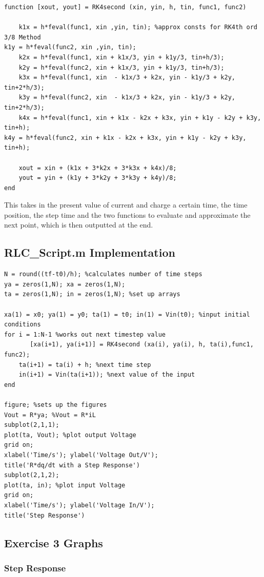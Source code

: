 \documentclass[11pt,a4paper]{article}
\begin{document}
\begin{verbatim}
function [xout, yout] = RK4second (xin, yin, h, tin, func1, func2)

	k1x = h*feval(func1, xin ,yin, tin); %approx consts for RK4th ord 3/8 Method
k1y = h*feval(func2, xin ,yin, tin);
	k2x = h*feval(func1, xin + k1x/3, yin + k1y/3, tin+h/3);
	k2y = h*feval(func2, xin + k1x/3, yin + k1y/3, tin+h/3);
	k3x = h*feval(func1, xin  - k1x/3 + k2x, yin - k1y/3 + k2y, tin+2*h/3);
	k3y = h*feval(func2, xin  - k1x/3 + k2x, yin - k1y/3 + k2y, tin+2*h/3);
	k4x = h*feval(func1, xin + k1x - k2x + k3x, yin + k1y - k2y + k3y, tin+h);
k4y = h*feval(func2, xin + k1x - k2x + k3x, yin + k1y - k2y + k3y, tin+h);

	xout = xin + (k1x + 3*k2x + 3*k3x + k4x)/8;
	yout = yin + (k1y + 3*k2y + 3*k3y + k4y)/8;
end
\end{verbatim}

This takes in the present value of current and charge a certain time, the time position, the step time and the two functions to evaluate and approximate the next point, which is then outputted at the end.

\subsection{RLC\_Script.m Implementation}

\begin{verbatim}
N = round((tf-t0)/h); %calculates number of time steps
ya = zeros(1,N); xa = zeros(1,N);
ta = zeros(1,N); in = zeros(1,N); %set up arrays

xa(1) = x0; ya(1) = y0; ta(1) = t0; in(1) = Vin(t0); %input initial conditions
for i = 1:N-1 %works out next timestep value
	   [xa(i+1), ya(i+1)] = RK4second (xa(i), ya(i), h, ta(i),func1, func2);
    ta(i+1) = ta(i) + h; %next time step
    in(i+1) = Vin(ta(i+1)); %next value of the input
end

figure; %sets up the figures
Vout = R*ya; %Vout = R*iL
subplot(2,1,1);
plot(ta, Vout); %plot output Voltage
grid on;
xlabel('Time/s'); ylabel('Voltage Out/V');
title('R*dq/dt with a Step Response')
subplot(2,1,2);
plot(ta, in); %plot input Voltage
grid on;
xlabel('Time/s'); ylabel('Voltage In/V');
title('Step Response')
\end{verbatim}

\subsection{Exercise 3 Graphs}
\subsubsection{Step Response}
\end{document}

